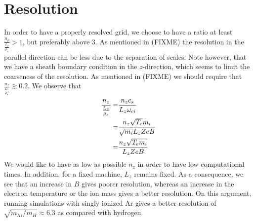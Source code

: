 \section{Resolution}
\label{sec:resolution}
%
In order to have a properly resolved grid, we choose to have a ratio at least $\frac{n_\rho}{\frac{L_\rho}{\rho_s}}>1$, but preferably above  $3$.
As mentioned in (FIXME)
the resolution in the parallel direction can be less due to the separation of scales.
Note however, that we have a sheath boundary condition in the $z$-direction, which seems to limit the coarseness of the resolution.
As mentioned in (FIXME)
we should require that $\frac{n_z}{\frac{L_z}{\rho_s}}\gtrsim0.2$.
We observe that
%
\begin{align*}
    \frac{n_z}{\frac{L_z}{\rho_s}}
    =& \frac{n_zc_s}{L_z \omega_{ci}}
    \\
    =& \frac{n_z\sqrt{T_e}m_i}{\sqrt{m_i} L_z ZeB}
    \\
    =& \frac{n_z\sqrt{T_em_i}}{L_z ZeB}
\end{align*}
%
We would like to have as low as possible $n_z$ in order to have low computational times.
In addition, for a fixed machine, $L_z$ remains fixed.
As a consequence, we see that an increase in $B$ gives poorer resolution, whereas an increase in the electron temperature or the ion mass gives a better resolution.
On this argument, running simulations with singly ionized Ar gives a better resolution of $\sqrt{m_{\text{Ar}}/m_H}\approx6.3$ as compared with hydrogen.
